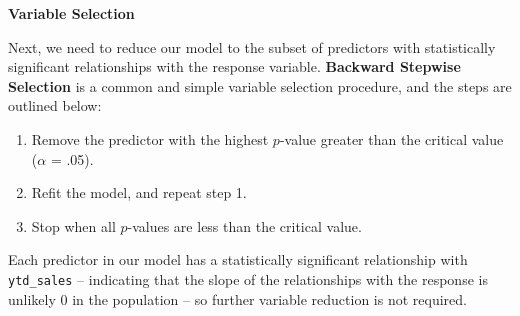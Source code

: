 \documentclass[
]{book}
\providecommand{\tightlist}{%
  \setlength{\itemsep}{0pt}\setlength{\parskip}{0pt}}
\begin{document}
\textbf{Variable Selection}

Next, we need to reduce our model to the subset of predictors with statistically significant relationships with the response variable. \textbf{Backward Stepwise Selection} is a common and simple variable selection procedure, and the steps are outlined below:

\begin{enumerate}
\def\labelenumi{\arabic{enumi}.}
\tightlist
\item
  Remove the predictor with the highest \(p\)-value greater than the critical value (\(\alpha\) = .05).
\item
  Refit the model, and repeat step 1.
\item
  Stop when all \(p\)-values are less than the critical value.
\end{enumerate}

Each predictor in our model has a statistically significant relationship with \texttt{ytd\_sales} -- indicating that the slope of the relationships with the response is unlikely 0 in the population -- so further variable reduction is not required.

\providecommand{\docline}[3]{\noalign{\global\setlength{\arrayrulewidth}{#1}}\arrayrulecolor[HTML]{#2}\cline{#3}}

\setlength{\tabcolsep}{2pt}

\renewcommand*{\arraystretch}{1.5}
\end{document}
